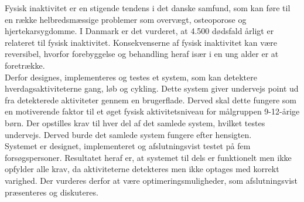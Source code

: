 Fysisk inaktivitet er en stigende tendens i det danske samfund, som kan føre til en række helbredsmæssige problemer som overvægt, osteoporose og hjertekarsygdomme. I Danmark er det vurderet, at 4.500 dødsfald årligt er relateret til fysisk inaktivitet. Konsekvenserne af fysisk inaktivitet kan være reversibel, hvorfor forebyggelse og behandling heraf især i en ung alder er at foretrække.\\
Derfor designes, implementeres og testes et system, som kan detektere hverdagsaktiviteterne gang, løb og cykling. Dette system giver undervejs point ud fra detekterede aktiviteter gennem en brugerflade. Derved skal dette fungere som en motiverende faktor til et øget fysisk aktivitetsniveau for målgruppen 9-12-årige børn. Der opstilles krav til hver del af det samlede system, hvilket testes undervejs. Derved burde det samlede system fungere efter hensigten.\\
Systemet er designet, implementeret og afslutningsvist testet på fem forsøgspersoner. Resultatet heraf er, at systemet til dels er funktionelt men ikke opfylder alle krav, da aktiviteterne detekteres men ikke optages med korrekt varighed. Der vurderes derfor at være optimeringsmuligheder, som afslutningsvist præsenteres og diskuteres.